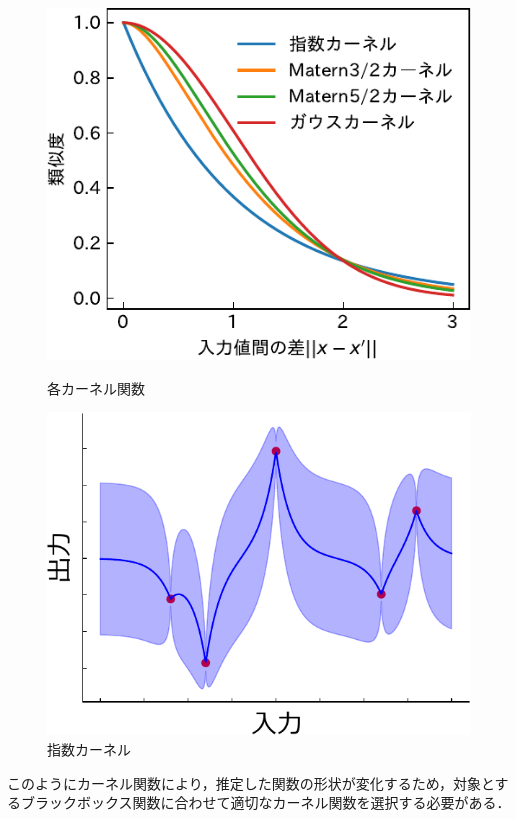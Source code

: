 \documentclass[twocolumn]{ltjarticle}
\begin{document}
\begin{figure}[htbp]
	\begin{minipage}[t]{0.5\columnwidth}
		\centering
		\includegraphics[width=\columnwidth]{./figures/kernel-crop.pdf}
		\vspace*{-0.8cm}
		\caption{各カーネル関数} \label{fig:matern_graph}
	\end{minipage}
	\begin{minipage}[t]{0.47\columnwidth}
		\centering
		\includegraphics[width=\columnwidth]{figures/material_8_exp.pdf}
		\vspace*{-0.8cm}
		\caption{指数カーネル} \label{fig:exp_kernel}
	\end{minipage}
\end{figure}
\noindent
このようにカーネル関数により，推定した関数の形状が変化するため，対象とするブラックボックス関数に合わせて適切なカーネル関数を選択する必要がある．
\end{document}
